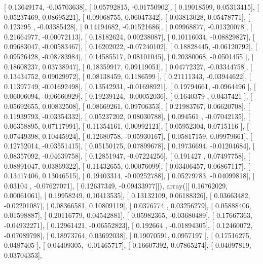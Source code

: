 \documentclass{article}
\begin{document}
       [ 0.13649174, -0.05703638],
       [ 0.05792815, -0.01750902],
       [ 0.19018599,  0.05313415],
       [ 0.05237469,  0.08695221],
       [ 0.09068755,  0.06047342],
       [ 0.03813028,  0.05478771],
       [ 0.123795  , -0.03385428],
       [ 0.14194682, -0.01521686],
       [ 0.09968877, -0.01320078],
       [ 0.21664977, -0.00072113],
       [ 0.18182624,  0.00238087],
       [ 0.10116034, -0.08829827],
       [ 0.09683047, -0.00583467],
       [ 0.16202022, -0.07240102],
       [ 0.18828445, -0.06120792],
       [ 0.09526428, -0.08783984],
       [ 0.14585517,  0.08101045],
       [ 0.20380068, -0.0501455 ],
       [ 0.18608237,  0.03738947],
       [ 0.18359917,  0.09119051],
       [ 0.04772327, -0.03344758],
       [ 0.13434752,  0.09029972],
       [ 0.08138459,  0.1186599 ],
       [ 0.21111343, -0.03944622],
       [ 0.11397749, -0.01692498],
       [ 0.13542931, -0.01698921],
       [ 0.19794661, -0.0964496 ],
       [ 0.06006094, -0.06660929],
       [ 0.19239124, -0.00052036],
       [ 0.1640379 ,  0.0437421 ],
       [ 0.05692655,  0.00832508],
       [ 0.08669261,  0.09706353],
       [ 0.21983767,  0.06620708],
       [ 0.11939793, -0.03354332],
       [ 0.05237202,  0.08030788],
       [ 0.094561  , -0.07042135],
       [ 0.06358895,  0.07117991],
       [ 0.11354161,  0.00992121],
       [ 0.05952304,  0.0715116 ],
       [ 0.07449398,  0.10445924],
       [ 0.12680758, -0.05930167],
       [ 0.05817159,  0.09979661],
       [ 0.12752014, -0.03551415],
       [ 0.05150175,  0.07899678],
       [ 0.19736694, -0.01204684],
       [ 0.08357092, -0.04639758],
       [ 0.12851947, -0.07224256],
       [ 0.191427  ,  0.07497758],
       [ 0.08891047,  0.03869322],
       [ 0.11432655,  0.00076099],
       [ 0.03406457,  0.06867117],
       [ 0.13417406,  0.13046515],
       [ 0.19403314, -0.00252788],
       [ 0.05279783, -0.04099818],
       [ 0.03104   , -0.07627071],
       [ 0.12637349, -0.09433977]]), array([[ 0.16762029,  0.00061061],
       [ 0.19958249,  0.10413535],
       [ 0.13132109,  0.06188326],
       [ 0.03663482, -0.02201087],
       [ 0.08366581,  0.10809119],
       [ 0.0376774 ,  0.03256279],
       [ 0.05888406,  0.01598887],
       [ 0.20116779,  0.04542881],
       [ 0.05982365, -0.03680489],
       [ 0.17667363, -0.04932271],
       [ 0.12961421, -0.06552823],
       [ 0.192664  , -0.01894305],
       [ 0.12460072, -0.07089798],
       [ 0.18973764,  0.03692038],
       [ 0.19070591,  0.0957197 ],
       [ 0.17516275,  0.0487405 ],
       [ 0.04409305, -0.01465717],
       [ 0.16607392,  0.07865274],
       [ 0.04097819,  0.03704353],
\end{document}
